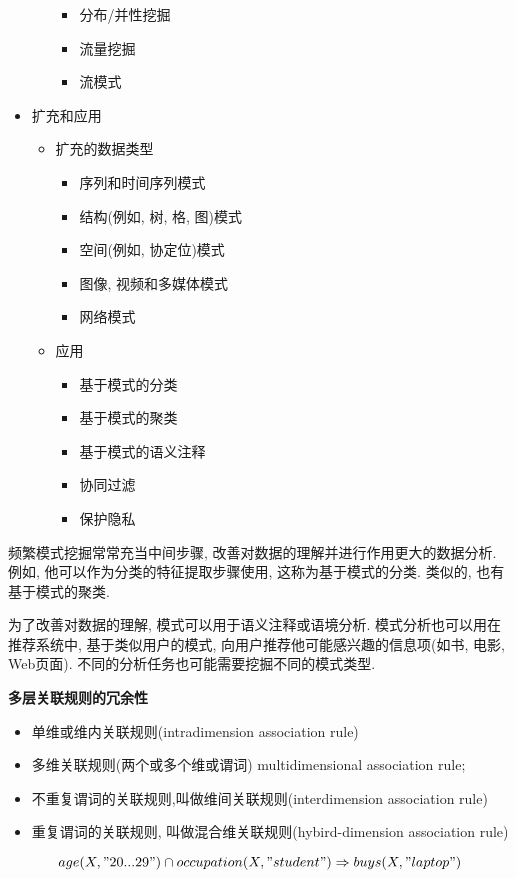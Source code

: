 \documentclass{article}
\begin{document}
\begin{itemize}
\begin{itemize}
				\begin{itemize}
					\item 分布/并性挖掘
					\item 流量挖掘
					\item 流模式
				\end{itemize}
		\end{itemize}
	\item 扩充和应用
		\begin{itemize}
			\item 扩充的数据类型
				\begin{itemize}
					\item 序列和时间序列模式
					\item 结构(例如, 树, 格, 图)模式
					\item 空间(例如, 协定位)模式
					\item 图像, 视频和多媒体模式
					\item 网络模式
				\end{itemize}
			\item 应用
				\begin{itemize}
					\item 基于模式的分类
					\item 基于模式的聚类
					\item 基于模式的语义注释
					\item 协同过滤
					\item 保护隐私
				\end{itemize}
		\end{itemize}
\end{itemize}

频繁模式挖掘常常充当中间步骤, 改善对数据的理解并进行作用更大的数据分析. 例如, 他可以作为分类的特征提取步骤使用, 这称为基于模式的分类. 类似的, 也有基于模式的聚类.

为了改善对数据的理解, 模式可以用于语义注释或语境分析. 模式分析也可以用在推荐系统中, 基于类似用户的模式, 向用户推荐他可能感兴趣的信息项(如书, 电影, Web页面). 不同的分析任务也可能需要挖掘不同的模式类型.

\textbf{多层关联规则的冗余性}

\begin{itemize}
\item 单维或维内关联规则(intradimension association rule)
\item 多维关联规则(两个或多个维或谓词) multidimensional association rule;
\item 不重复谓词的关联规则,叫做维间关联规则(interdimension association rule)
\item 重复谓词的关联规则, 叫做混合维关联规则(hybird-dimension association rule)
\end{itemize}
$$
age(X,"20...29") \cap occupation(X,"student") \Rightarrow buys(X,"laptop")
$$
\end{document}
